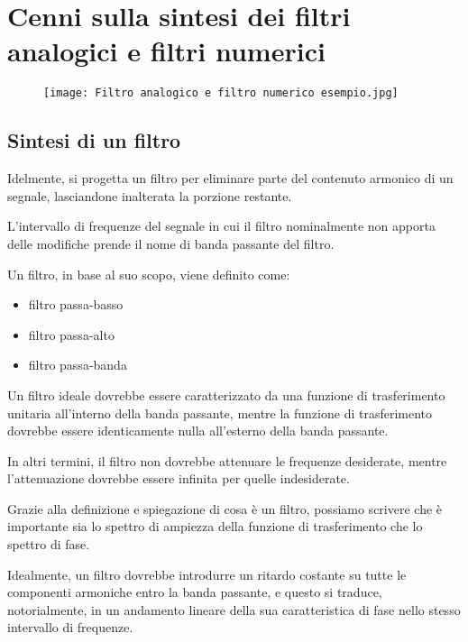 \chapter{Cenni sulla sintesi dei filtri analogici e filtri numerici}

\begin{figure}[h]
    \centering
    \texttt{[image: Filtro analogico e filtro numerico esempio.jpg]}
\end{figure}  

\newpage 

\section{Sintesi di un filtro}

Idelmente, si progetta un filtro per eliminare parte del contenuto armonico di un segnale, 
lasciandone inalterata la porzione restante. \newline 

L'intervallo di frequenze del segnale in cui il filtro nominalmente non apporta delle modifiche  
prende il nome di banda passante del filtro. \newline 

Un filtro, in base al suo scopo, viene definito come: 

\begin{itemize}
    \item filtro passa-basso 
    \item filtro passa-alto 
    \item filtro passa-banda 
\end{itemize} 

Un filtro ideale dovrebbe essere caratterizzato da una funzione di trasferimento unitaria all'interno della banda passante, 
mentre la funzione di trasferimento dovrebbe essere identicamente nulla all'esterno della banda passante. \newline 

In altri termini, il filtro non dovrebbe attenuare le frequenze desiderate, 
mentre l'attenuazione dovrebbe essere infinita per quelle indesiderate. \newline 

Grazie alla definizione e spiegazione di cosa è un filtro, 
possiamo scrivere che è importante sia lo spettro di ampiezza della funzione di trasferimento 
che lo spettro di fase. \newline 

Idealmente, un filtro dovrebbe introdurre un ritardo costante su tutte le componenti armoniche entro la banda passante, 
e questo si traduce, notorialmente, in un andamento lineare della sua caratteristica di fase nello stesso intervallo 
di frequenze. \newline 

